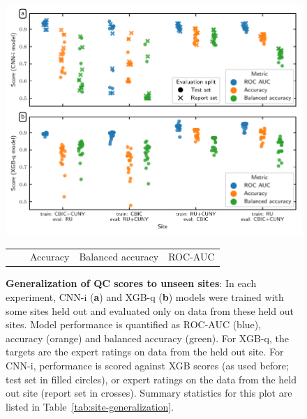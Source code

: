 \documentclass[9pt,lineno]{elife}
\begin{document}
\begin{figure}[tbp]
    {\label{fig:site-generalization:dl}}
    {\label{fig:site-generalization:xgb}}
    \centering
    \includegraphics[width=\linewidth]{site-generalization/site_generalization.pdf}
    \caption{%
        {\bf Generalization of QC scores to unseen sites}: In each experiment, CNN-i (\textbf{a}) and XGB-q (\textbf{b}) models were trained with some sites held out and evaluated only on data from these held out sites. Model performance is quantified as ROC-AUC (blue), accuracy (orange) and balanced accuracy (green). For XGB-q, the targets are the expert ratings on data from the held out site. For CNN-i, performance is scored against XGB scores (as used before; test set in filled circles), or expert ratings on the data from the held out site (report set in crosses). Summary statistics for this plot are listed in Table~\ref{tab:site-generalization}.
    }
    \label{fig:site-generalization}
    \vspace{1em}
    \begin{tabular}{lllll}
    \toprule
          &                            &       Accuracy & Balanced accuracy &        ROC-AUC \\

\end{tabular}
\end{figure}
\end{document}
